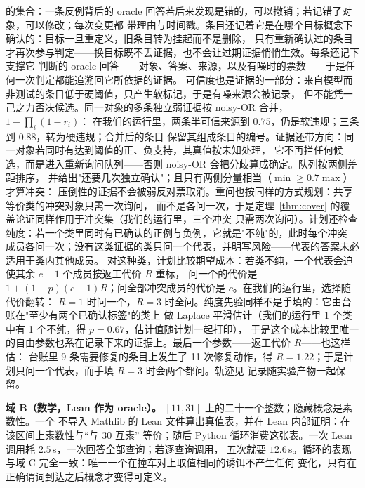 \documentclass[11pt]{ctexart}
\begin{document}
的集合：一条反例背后的 oracle 回答若后来发现是错的，可以撤销；若记错了对象，可以修改；每次变更都
带理由与时间戳。条目还记着它是在哪个目标概念下确认的：目标一旦重定义，旧条目转为挂起而不是删除，
只有重新确认过的条目才再次参与判定——换目标既不丢证据，也不会让过期证据悄悄生效。每条还记下支撑它
判断的 oracle 回答——对象、答案、来源，以及有噪时的票数——于是任何一次判定都能追溯回它所依据的证据。
可信度也是证据的一部分：来自模型而非测试的条目低于硬阈值，只产生软标记，于是有噪来源会被记录，
但不能凭一己之力否决候选。同一对象的多条独立弱证据按 noisy-OR 合并，$1-\prod_i(1-r_i)$：
在我们的运行里，两条半可信来源到 $0.75$，仍是软违规；三条到 $0.88$，转为硬违规；合并后的条目
保留其组成条目的编号。证据还带方向：同一对象若同时有达到阈值的正、负支持，其真值按未知处理，
它不再拦任何候选，而是进入重新询问队列——否则 noisy-OR 会把分歧算成确定。队列按两侧差距排序，
并给出"还要几次独立确认"；且只有两侧分量相当（$\min \ge 0.7\max$）才算冲突：
压倒性的证据不会被弱反对票取消。重问也按同样的方式规划：共享等价类的冲突对象只需一次询问，
而不是各问一次，于是定理~\ref{thm:cover} 的覆盖论证同样作用于冲突集（我们的运行里，三个冲突
只需两次询问）。计划还检查纯度：若一个类里同时有已确认的正例与负例，它就是"不纯"的，此时每个冲突
成员各问一次；没有这类证据的类只问一个代表，并明写风险——代表的答案未必适用于类内其他成员。
对这种类，计划比较期望成本：若类不纯，一个代表会迫使其余 $c-1$ 个成员按返工代价 $R$ 重标，
问一个的代价是 $1+(1-p)(c-1)R$；问全部冲突成员的代价是 $c$。在我们的运行里，选择随代价翻转：
$R=1$ 时问一个，$R=3$ 时全问。纯度先验同样不是手填的：它由台账在"至少有两个已确认标签"的类上
做 Laplace 平滑估计（我们的运行里 1 个类中有 1 个不纯，得 $p=0.67$，估计值随计划一起打印），
于是这个成本比较里唯一的自由参数也系在记录下来的证据上。最后一个参数——返工代价 $R$——也这样估：
台账里 9 条需要修复的条目上发生了 11 次修复动作，得 $R=1.22$；于是计划只问一个代表，而手填 $R=3$
时会两个都问。轨迹见
记录随实验产物一起保留。

\textbf{域 B（数学，Lean 作为 oracle）。} $[11,31]$ 上的二十一个整数；隐藏概念是素数性。一个
不导入 Mathlib 的 Lean 文件算出真值表，并在 Lean 内部证明：在该区间上素数性与“与 30 互素”
等价；随后 Python 循环消费这张表。一次 Lean 调用耗 $2.5$\,s，一次回答全部查询；若逐查询调用，
五次就要 $12.6$\,s。循环的表现与域 C 完全一致：唯一一个在撞车对上取值相同的诱饵不产生任何
变化，只有在正确谓词到达之后概念才变得可定义。
\end{document}
